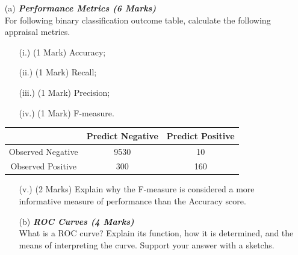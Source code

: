 \documentclass[a4paper,12pt]{article}
\begin{document}
\begin{itemize}
	\item[(a)] \textbf{\textit{Performance Metrics (6 Marks)}}\\
	For following binary classification outcome table, calculate the following appraisal metrics.
	\begin{itemize}	
		\item[(i.)] (1 Mark)	Accuracy;
		\item[(ii.)] (1 Mark)	Recall;
		\item[(iii.)] (1 Mark)	Precision;
		\item[(iv.)] (1 Mark)	F-measure.
	\end{itemize}	
	\vspace{-0.6cm}
		\begin{center}
		\begin{tabular}{|c|c|c|}
			\hline  & \phantom{spa}Predict Negative\phantom{spa} & \phantom{spa}Predict Positive\phantom{spa} \\ 
			\hline\phantom{spa} Observed Negative \phantom{spa}&	9530	&	10	\\ 
			\hline \phantom{spa}Observed Positive\phantom{spa} & 	300	&	160	\\ 
			\hline 
		\end{tabular} 
	\end{center}
	
	\begin{itemize}	
		\item[(v.)] (2 Marks) Explain why the F-measure is considered a more informative measure of performance than the Accuracy score.
	
	\end{itemize}
\bigskip
\begin{itemize}
	\item[(b)]  \textbf{\textit{ROC Curves	(4 Marks) }}\\
		What is a ROC curve? Explain its function, how it is determined, and the means of interpreting the curve. Support your answer with a sketchs.
\end{itemize}
\end{itemize}


\newpage
\end{document}
